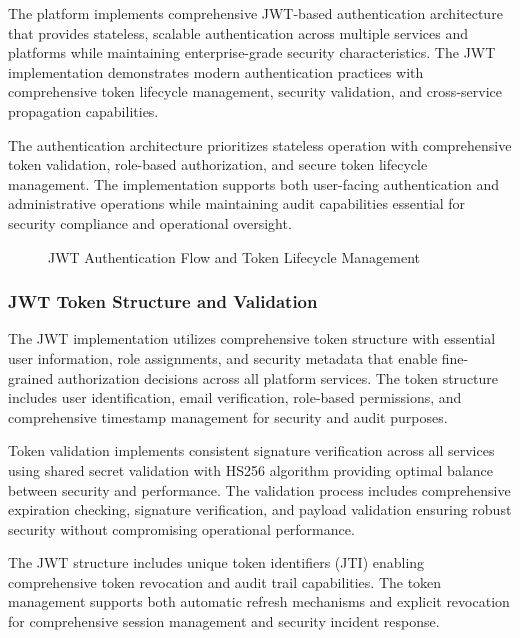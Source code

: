 The platform implements comprehensive JWT-based authentication architecture that provides stateless, scalable authentication across multiple services and platforms while maintaining enterprise-grade security characteristics. The JWT implementation demonstrates modern authentication practices with comprehensive token lifecycle management, security validation, and cross-service propagation capabilities.

The authentication architecture prioritizes stateless operation with comprehensive token validation, role-based authorization, and secure token lifecycle management. The implementation supports both user-facing authentication and administrative operations while maintaining audit capabilities essential for security compliance and operational oversight.

\begin{figure}[H]
\centering
\caption{JWT Authentication Flow and Token Lifecycle Management}
\label{fig:jwt-authentication-flow}
\end{figure}

\subsubsection{JWT Token Structure and Validation}

The JWT implementation utilizes comprehensive token structure with essential user information, role assignments, and security metadata that enable fine-grained authorization decisions across all platform services. The token structure includes user identification, email verification, role-based permissions, and comprehensive timestamp management for security and audit purposes.

Token validation implements consistent signature verification across all services using shared secret validation with HS256 algorithm providing optimal balance between security and performance. The validation process includes comprehensive expiration checking, signature verification, and payload validation ensuring robust security without compromising operational performance.

The JWT structure includes unique token identifiers (JTI) enabling comprehensive token revocation and audit trail capabilities. The token management supports both automatic refresh mechanisms and explicit revocation for comprehensive session management and security incident response.

